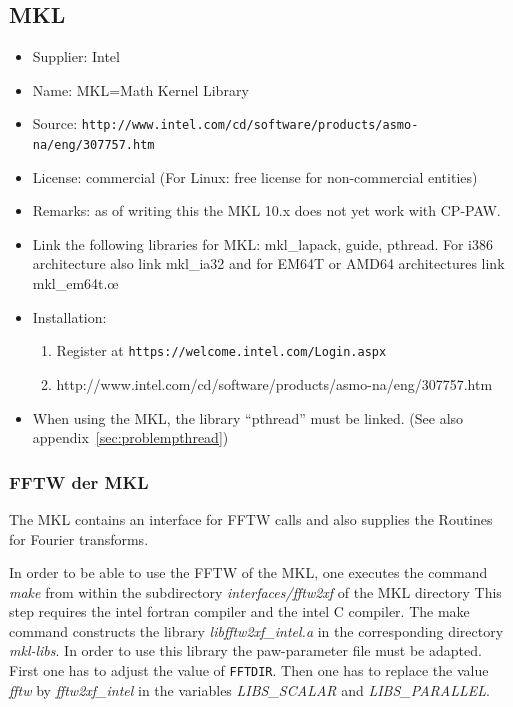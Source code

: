 \documentclass[a4paper,10pt]{report}
\newcommand{\mytt}[1]{{\tt #1}}
\begin{document}
\subsection{MKL}
\begin{itemize}
\item Supplier: Intel
\item Name: MKL=Math Kernel Library
\item Source: \mytt{http://www.intel.com/cd/software/products/asmo-na/eng/307757.htm}
\item License: commercial (For Linux: free license for non-commercial entities)
\item Remarks: as of writing this the MKL 10.x does not yet work with CP-PAW.
\item Link the following libraries for MKL: mkl\_lapack, guide,
  pthread.  For i386 architecture also link mkl\_ia32 and for EM64T or
  AMD64 architectures link mkl\_em64t.œ
\item Installation:
\begin{enumerate}
\item Register at \mytt{https://welcome.intel.com/Login.aspx}
\item http://www.intel.com/cd/software/products/asmo-na/eng/307757.htm
\end{enumerate}
\item When using the MKL, the library ``pthread'' must be linked. (See
also appendix~\ref{sec:problempthread})
\end{itemize}


\subsubsection{FFTW der MKL}
The MKL contains an interface for FFTW calls and also supplies the
Routines for Fourier transforms.

In order to be able to use the FFTW of the MKL, one executes the
command \textit{make} from within the subdirectory
\textit{interfaces/fftw2xf} of the MKL directory This step requires
the intel fortran compiler and the intel C compiler.  The make command
constructs the library \textit{libfftw2xf\_intel.a} in the
corresponding directory \textit{mkl-libs}. In order to use this
library the paw-parameter file must be adapted. First one has to
adjust the value of \mytt{FFTDIR}.  Then one has to replace the value
\textit{fftw} by \textit{fftw2xf\_intel} in the variables
\textit{LIBS\_SCALAR } and \textit{LIBS\_PARALLEL}.
\end{document}
